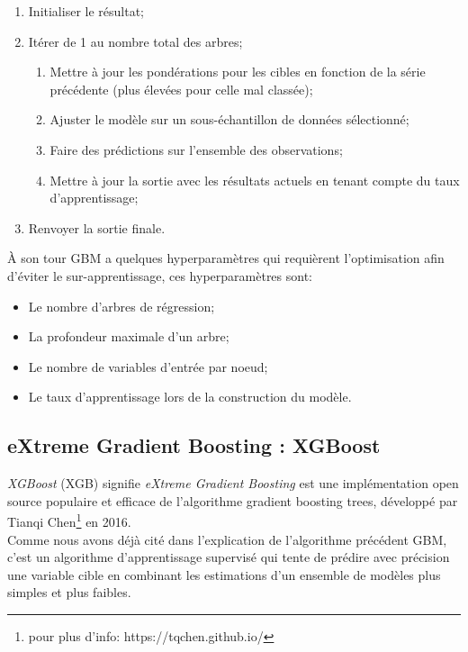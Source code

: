 \begin{tcolorbox}
\footnotesize {
\begin{enumerate}
\item Initialiser le résultat;
\item Itérer de 1 au nombre total des arbres;
	\begin{enumerate}
		\item Mettre à jour les pondérations pour les cibles en fonction de la série précédente (plus élevées pour celle mal classée);
		\item Ajuster le modèle sur un sous-échantillon de données sélectionné;
		\item Faire des prédictions sur l’ensemble des observations;
		\item Mettre à jour la sortie avec les résultats actuels en tenant compte du taux d’apprentissage;
	\end{enumerate}
\item Renvoyer la sortie finale.\\
\end{enumerate}
}
\end{tcolorbox}
À son tour GBM a quelques hyperparamètres qui requièrent l'optimisation afin d'éviter le sur-apprentissage, ces hyperparamètres sont:
\begin{itemize}
    \item[\textbullet] Le nombre d'arbres de régression;
    \item[\textbullet] La profondeur maximale d’un arbre;
    \item[\textbullet] Le nombre de variables d'entrée par noeud;
    \item[\textbullet] Le taux d'apprentissage lors de la construction du modèle.
\end{itemize}

\subsection{eXtreme Gradient Boosting : XGBoost}
\textit{XGBoost} (XGB) signifie \textit{eXtreme Gradient Boosting} est une implémentation open source populaire et efficace de l'algorithme gradient boosting trees, développé par Tianqi Chen\footnote{pour plus d'info: https://tqchen.github.io/} en 2016. \\

Comme nous avons déjà cité dans l'explication de l'algorithme précédent GBM, c'est un algorithme d'apprentissage supervisé qui tente de prédire avec précision une variable cible en combinant les estimations d’un ensemble de modèles plus simples et plus faibles. \\

